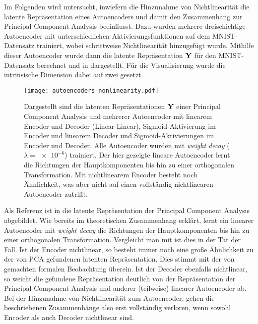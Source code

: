 Im Folgenden wird untersucht, inwiefern die Hinzunahme von Nichtlinearität die latente
Repräsentation eines Autoencoders und damit den Zusammenhang zur Principal Component Analysis
beeinflusst. Dazu wurden mehrere dreischichtige Autoencoder mit unterschiedlichen
Aktivierungsfunktionen auf dem MNIST-Datensatz trainiert, wobei schrittweise Nichtlinearität
hinzugefügt wurde. Mithilfe dieser Autoencoder wurde dann die latente Repräsentation $\mathbf{Y}$ für
den MNIST-Datensatz berechnet und in  dargestellt. Für die
Visualisierung wurde die intrinsische Dimension dabei auf zwei gesetzt.
\begin{figure}[ht]
	\centering
	\texttt{[image: autoencoders-nonlinearity.pdf]}
	\caption[Latente Repräsentationen von PCA und drei Autoencodern mit unterschiedlichen Aktivierungsfunktionen]{Dargestellt sind die latenten Repräsentationen $\mathbf{Y}$ einer \captiona Principal Component Analysis und mehrerer Autoencoder mit \captionb linearem Encoder und Decoder (Linear-Linear), \captionc Sigmoid-Aktivierung im Encoder und linearem Decoder und \captiond Sigmoid-Aktivierungen im Encoder und Decoder. Alle Autoencoder wurden mit \textit{weight decay} ($\lambda = \num{e-6}$) trainiert. Der hier gezeigte lineare Autoencoder lernt die Richtungen der Hauptkomponenten bis hin zu einer orthogonalen Transformation. Mit nichtlinearem Encoder besteht noch Ähnlichkeit, was aber nicht auf einen vollständig nichtlinearen Autoencoder zutrifft.}
	\label{fig:Autoencoder-Nichtlinearitaet}
\end{figure}
Als Referenz ist in \captiona die latente Repräsentation der Principal Component Analysis abgebildet. Wie bereits im theoretischen Zusammenhang erklärt, lernt ein linearer Autoencoder mit \textit{weight decay} die Richtungen der Hauptkomponenten bis hin zu einer orthogonalen Transformation. Vergleicht man  \captiona mit \captionb ist dies in der Tat der Fall. Ist der Encoder nichtlinear, so besteht immer noch eine große Ähnlichkeit zu der von PCA gefundenen latenten Repräsentation. Dies stimmt mit der von \textcite{Bourlard.1988} gemachten formalen Beobachtung überein. Ist der Decoder ebenfalls nichtlinear, so weicht die gefundene Repräsentation deutlich von der Repräsentation der Principal Component Analysis und anderer (teilweise) linearer Autoencoder ab. Bei der Hinzunahme von Nichtlinearität zum Autoencoder, gehen die beschriebenen Zusammenhänge also erst vollständig verloren, wenn sowohl Encoder als auch Decoder nichtlinear sind.

